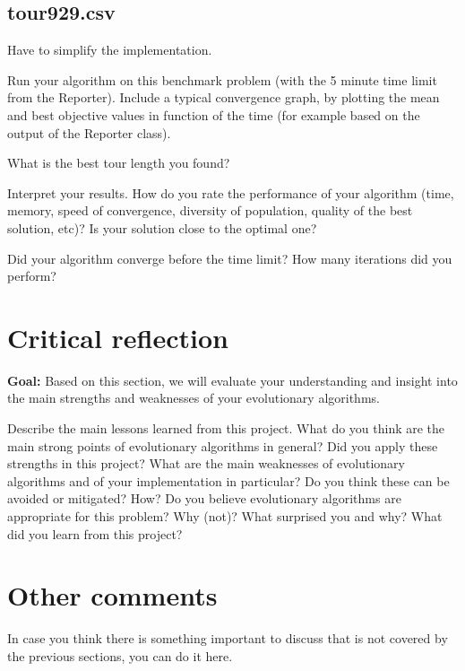 \documentclass[a4paper,10pt]{article}
\newcommand{\ReplaceMe}[1]{{\color{blue}#1}}
\newcommand{\RemoveMe}[1]{{\color{purple}#1}}
\begin{document}
\subsection{tour929.csv}
Have to simplify the implementation.


\ReplaceMe{Run your algorithm on this benchmark problem (with the 5 minute time limit from the Reporter). Include a typical convergence graph, by plotting the mean and best objective values in function of the time (for example based on the output of the Reporter class). 

What is the best tour length you found? 

Interpret your results. How do you rate the performance of your algorithm (time, memory, speed of convergence, diversity of population, quality of the best solution, etc)? Is your solution close to the optimal one? 

Did your algorithm converge before the time limit? How many iterations did you perform?}



\section{Critical reflection}

\RemoveMe{\textbf{Goal:} Based on this section, we will evaluate your understanding and insight into the main strengths and weaknesses of your evolutionary algorithms.}

\ReplaceMe{Describe the main lessons learned from this project. What do you think are the main strong points of evolutionary algorithms in general? Did you apply these strengths in this project? What are the main weaknesses of evolutionary algorithms and of your implementation in particular? Do you think these can be avoided or mitigated? How? Do you believe evolutionary algorithms are appropriate for this problem? Why (not)? What surprised you and why? What did you learn from this project?}

\section{Other comments} \label{sec_other}

\ReplaceMe{In case you think there is something important to discuss that is not covered by the previous sections, you can do it here. }
\end{document}
